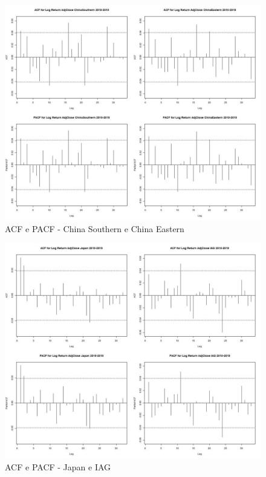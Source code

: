 \documentclass[12pt]{article}
\begin{document}
\begin{figure}[H]
	\centering
	\includegraphics[width=0.8\linewidth]{../Modelos/CorrelationsChina10_19}
	\caption{ACF e PACF - China Southern e China Eastern}
	\label{fig:correlationschina1019}
\end{figure}

\begin{figure}[H]
	\centering
	\includegraphics[width=0.8\linewidth]{../Modelos/CorrelationsJapanIAG10_19}
	\caption{ACF e PACF - Japan e IAG}
	\label{fig:correlationsjapaniag1019}
\end{figure}
\end{document}
